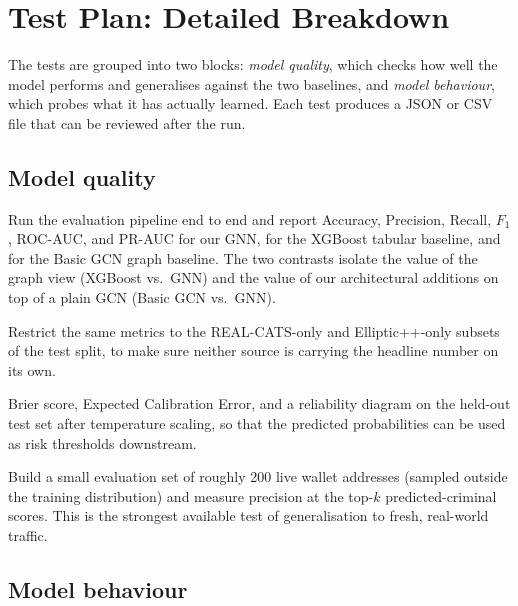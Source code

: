 \documentclass[11pt]{article}
\begin{document}
\section{Test Plan: Detailed Breakdown}\label{sec:tests}

The tests are grouped into two blocks: \textit{model quality}, which checks how well the model performs and
generalises against the two baselines, and \textit{model behaviour}, which probes what it has actually learned.
Each test produces a JSON or CSV file that can be reviewed after the run.

\subsection*{Model quality}

\begin{description}[leftmargin=0pt,labelindent=0pt,style=nextline,itemsep=4pt,parsep=0pt]
  \item[\textit{Held-out test evaluation.}] Run the evaluation pipeline end to end and report Accuracy, Precision,
    Recall, $F_1$, ROC-AUC, and PR-AUC for our GNN, for the XGBoost tabular baseline, and for the Basic GCN
    graph baseline. The two contrasts isolate the value of the graph view (XGBoost vs.\ GNN) and the value of
    our architectural additions on top of a plain GCN (Basic GCN vs.\ GNN).
  \item[\textit{Per-source generalisation.}] Restrict the same metrics to the REAL-CATS-only and Elliptic++-only
    subsets of the test split, to make sure neither source is carrying the headline number on its own.
  \item[\textit{Calibration quality.}] Brier score, Expected Calibration Error, and a reliability diagram on the
    held-out test set after temperature scaling, so that the predicted probabilities can be used as risk
    thresholds downstream.
  \item[\textit{Live-wallet evaluation.}] Build a small evaluation set of roughly 200 live wallet addresses
    (sampled outside the training distribution) and measure precision at the top-$k$ predicted-criminal scores.
    This is the strongest available test of generalisation to fresh, real-world traffic.
\end{description}

\subsection*{Model behaviour}
\end{document}
